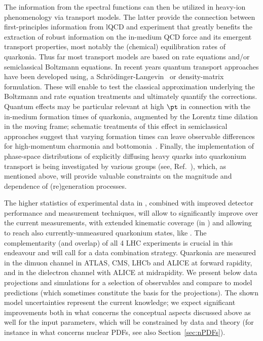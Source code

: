 \documentclass[../report.tex]{subfiles}
\begin{document}
The information from the spectral functions can then be utilized in heavy-ion phenomenology via transport models. The latter provide the connection between first-principles information from lQCD and experiment that greatly benefits the extraction of robust information on the in-medium QCD force and its emergent transport properties, most notably the (chemical) equilibration rates of quarkonia. 
Thus far most transport models are based on rate equations and/or semiclassical Boltzmann equations. In recent years quantum transport approaches have been developed using, \eg a Schr\"odinger-Langevin~\cite{Blaizot:2015hya,Katz:2015qja,Kajimoto:2017rel} or density-matrix~\cite{Akamatsu:2014qsa,Brambilla:2016wgg} formulation. These will enable to test the classical approximation underlying the Boltzmann and rate equation treatments and ultimately quantify the corrections.  Quantum effects may be particular relevant at high $\pt$ in connection with the in-medium formation times of quarkonia, augmented by the Lorentz time dilation in the moving frame; schematic treatments of this effect in semiclassical approaches suggest that varying formation times can leave observable differences for high-momentum charmonia and bottomonia~\cite{Song:2015bja,Hoelck:2016tqf,Du:2017qkv,Aronson:2017ymv,Krouppa:2017jlg}. 
Finally, the implementation of phase-space distributions of explicitly diffusing heavy quarks into quarkonium transport is being investigated by various groups (see, \eg Ref.~\cite{Yao:2017fuc}), which, as mentioned above, will provide valuable constraints on the magnitude and \pt dependence of (re)generation processes.     


The higher statistics of experimental data in \RunsThreeFour, combined with improved detector performance and measurement techniques, will allow to significantly improve over the current measurements, with extended kinematic coverage (in \pT) and allowing to reach also currently-unmeasured quarkonium states, like 
.
The complementarity (and overlap) of all 4 LHC experiments is crucial in this endeavour and will call for a data combination strategy.
Quarkonia are measured in the dimuon channel in ATLAS, CMS, LHCb and ALICE at forward rapidity, and in the dielectron channel with ALICE at midrapidity.
We present below data projections and simulations for a selection of observables and compare to model predictions (which sometimes constitute the basis for the projections). The shown model uncertainties represent the current knowledge; we expect significant improvements both in what concerns the conceptual aspects discussed above as well for the input parameters, which will be constrained by data and theory (for instance in what concerns nuclear PDFs, see also Section~\ref{sec:nPDFs}).
\end{document}
